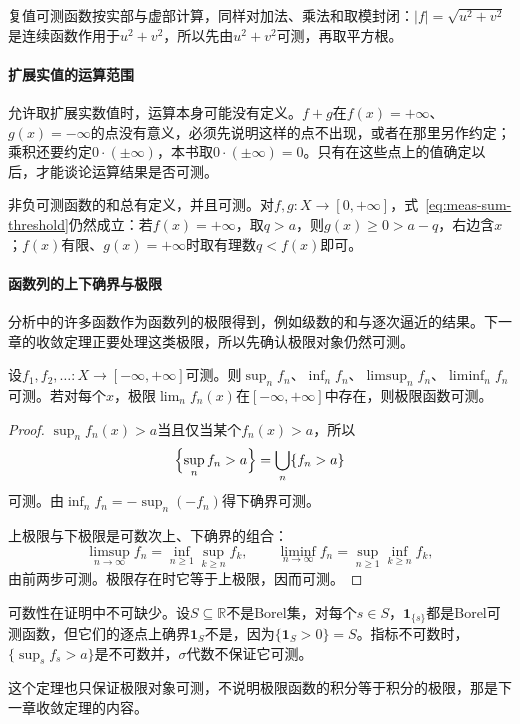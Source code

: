 复值可测函数按实部与虚部计算，同样对加法、乘法和取模封闭：$\lvert f\rvert=\sqrt{u^2+v^2}$是连续函数作用于$u^2+v^2$，所以先由$u^2+v^2$可测，再取平方根。

\paragraph{扩展实值的运算范围}
允许取扩展实数值时，运算本身可能没有定义。$f+g$在$f(x)=+\infty$、$g(x)=-\infty$的点没有意义，必须先说明这样的点不出现，或者在那里另作约定；乘积还要约定$0\cdot(\pm\infty)$，本书取$0\cdot(\pm\infty)=0$。只有在这些点上的值确定以后，才能谈论运算结果是否可测。

非负可测函数的和总有定义，并且可测。对$f,g:X\to[0,+\infty]$，式~\eqref{eq:meas-sum-threshold}仍然成立：若$f(x)=+\infty$，取$q>a$，则$g(x)\geq0>a-q$，右边含$x$；$f(x)$有限、$g(x)=+\infty$时取有理数$q<f(x)$即可。

\paragraph{函数列的上下确界与极限}
分析中的许多函数作为函数列的极限得到，例如级数的和与逐次逼近的结果。下一章的收敛定理正要处理这类极限，所以先确认极限对象仍然可测。

\begin{theorem}[可数极限的可测性]
\label{thm:meas-limits}
设$f_1,f_2,\dots:X\to[-\infty,+\infty]$可测。则$\sup_nf_n$、$\inf_nf_n$、$\limsup_nf_n$、$\liminf_nf_n$可测。若对每个$x$，极限$\lim_nf_n(x)$在$[-\infty,+\infty]$中存在，则极限函数可测。
\end{theorem}

\begin{proof}
$\sup_nf_n(x)>a$当且仅当某个$f_n(x)>a$，所以
\[
 \Bigl\{\sup_nf_n>a\Bigr\}=\bigcup_n\{f_n>a\}
\]
可测。由$\inf_nf_n=-\sup_n(-f_n)$得下确界可测。

上极限与下极限是可数次上、下确界的组合：
\[
 \limsup_{n\to\infty}f_n=\inf_{n\geq1}\sup_{k\geq n}f_k,\qquad
 \liminf_{n\to\infty}f_n=\sup_{n\geq1}\inf_{k\geq n}f_k,
\]
由前两步可测。极限存在时它等于上极限，因而可测。
\end{proof}

可数性在证明中不可缺少。设$S\subseteq\mathbb R$不是Borel集，对每个$s\in S$，$\mathbf 1_{\{s\}}$都是Borel可测函数，但它们的逐点上确界$\mathbf 1_S$不是，因为$\{\mathbf 1_S>0\}=S$。指标不可数时，$\{\sup_sf_s>a\}$是不可数并，$\sigma$代数不保证它可测。

这个定理也只保证极限对象可测，不说明极限函数的积分等于积分的极限，那是下一章收敛定理的内容。

